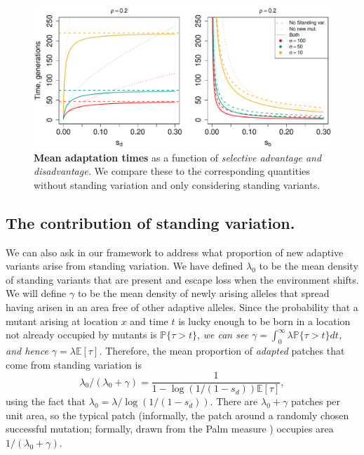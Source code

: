 \documentclass{article}
\newcommand{\gc}[1]{{\it\color{blue}#1}}
\renewcommand{\P}{\mathbb{P}}
\newcommand{\E}{\mathbb{E}}
\begin{document}
\begin{figure}[ht]
\begin{center}
  \includegraphics[width=1.0\textwidth]{G6PD_chartimes_sd_sb.pdf}   %
\caption{ %
{\bf Mean adaptation times} as a function of \gc{selective advantage and disadvantage.}
We compare these to the corresponding quantities without standing variation and only considering standing variants.
} \label{G6PD_chartimes}
\end{center}
\end{figure}




\subsection{The contribution of standing variation.}
We can also ask in our framework to address what proportion of new adaptive variants arise from standing variation.
We have defined $\lambda_0$ to be the mean density
of standing variants that are present and escape loss when the
environment shifts.
We will define $\gamma$ to be the mean density of newly arising alleles
that spread having arisen in an area free of other adaptive alleles.
Since the probability that a mutant arising at location $x$ and time $t$ 
is lucky enough to be born in a location not already occupied by mutants
is $\P\{ \tau > t \}$,
\gc{we can see  $\gamma = \int_0^\infty \lambda \P\{\tau>t\} dt$, and hence
$\gamma = \lambda \E[\tau] $.}
Therefore, the mean proportion of \gc{adapted} patches that come from standing variation
is 
\begin{equation} \label{prop_patches_standing}
\lambda_0 / (\lambda_0 + \gamma)  = \frac{1}{1-\log(1/(1-s_d)) \E[\tau]} ,
\end{equation}
using the fact that $\lambda_0 = \lambda / \log(1/(1-s_d))$.
There are $\lambda_0 + \gamma$ patches per unit area, so
the typical patch (informally, the patch around a randomly chosen
successful mutation; formally, drawn from the Palm measure
\citep{cox1980point}) occupies area $1/(\lambda_0 + \gamma)$. 
\end{document}
